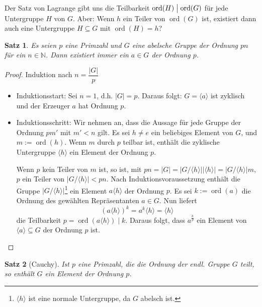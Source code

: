 \documentclass[12pt]{scrartcl} %
\DeclareMathOperator{\ord}{ord}
\newcommand{\divides}{\bigm|}
\newtheorem{thm}{Satz}
\theoremstyle{definition}
\theoremstyle{remark}
\begin{document}
Der Satz von Lagrange gibt uns die Teilbarkeit $\ord(H) \divides \ord(G)$ für jede Untergruppe $H$ von $G$.
Aber: Wenn \(h\) ein Teiler von $\ord(G)$ ist, existiert dann auch eine Untergruppe \(H \subseteq G\) mit $\ord(H)=h$?

\begin{thm}
	Es seien $p$ eine Primzahl und $G$ eine abelsche Gruppe der Ordnung $pn$ für ein $n\in\mathbb{N}$.
	Dann existiert immer ein $a \in G$ der Ordnung $p$.
\end{thm}

\begin{proof}
	Induktion nach $n=\dfrac{|G|}{p}$
	\begin{itemize}
	\item Induktionsstart: Sei \(n=1\), d.h. $|G|=p$.
		Daraus folgt: $G=\langle a\rangle$ ist zyklisch und der Erzeuger \(a\) hat Ordnung \(p\).
	\item Induktionsschritt: Wir nehmen an, dass die Aussage für jede Gruppe der Ordnung $pm'$ mit $m'<n$ gilt.
		Es sei $h\neq e$ ein beliebiges Element von \(G\), und $m:=\ord(h)$.
		Wenn \(m\) durch \(p\) teilbar ist, enthält die zyklische Untergruppe $\langle h\rangle$ ein Element der Ordnung \(p\).

		Wenn \(p\) kein Teiler von \(m\) ist, so ist, mit \(pn = |G| = |G/\langle h\rangle||\langle h\rangle| = |G/\langle h\rangle|m\), \(p\) ein Teiler von $|G/\langle h\rangle|<pn$.
		Nach Induktionsvoraussetzung enthält die Gruppe $|G/\langle h\rangle|$\footnote{\(\langle h\rangle\) ist eine normale Untergruppe, da \(G\) abelsch ist.} ein Element $a\langle h\rangle$ der Ordnung \(p\).
		Es sei $k:=\ord(a)$ die Ordnung des gewählten Repräsentanten $a \in G$.
		Nun liefert \[(a\langle h\rangle)^k=a^k\langle h\rangle=\langle h\rangle\] die Teilbarkeit \(p = \ord(a\langle h\rangle) \mid k\).
		Daraus folgt, dass $a^{\frac{k}{p}}$ ein Element von $\langle a\rangle \subseteq G$ der Ordnung \(p\) ist.\qedhere
	\end{itemize}
\end{proof}

\begin{thm}[Cauchy]
	Ist \(p\) eine Primzahl, die die Ordnung der endl. Gruppe \(G\) teilt, so enthält \(G\) ein Element der Ordnung \(p\).
\end{thm}
\end{document}
